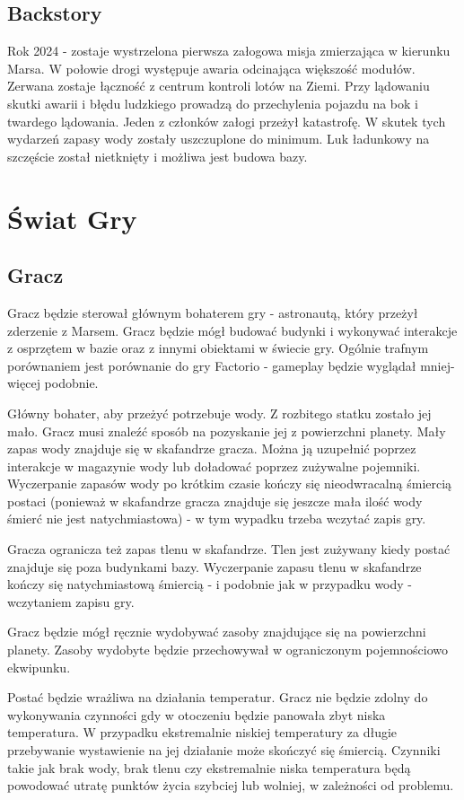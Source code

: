 \documentclass[a4paper,12pt]{article}
\begin{document}
\subsection{Backstory}
Rok 2024 - zostaje wystrzelona pierwsza załogowa misja zmierzająca w kierunku Marsa. W połowie drogi występuje awaria odcinająca większość modułów. Zerwana zostaje łączność z centrum kontroli lotów na Ziemi. Przy lądowaniu skutki awarii i błędu ludzkiego prowadzą do przechylenia pojazdu na bok i twardego lądowania. Jeden z członków załogi przeżył katastrofę. W skutek tych wydarzeń zapasy wody zostały uszczuplone do minimum. Luk ładunkowy na szczęście został nietknięty i możliwa jest budowa bazy.
\section{Świat Gry}
\subsection{Gracz}
Gracz będzie sterował głównym bohaterem gry - astronautą, który przeżył zderzenie z Marsem. Gracz będzie mógł budować budynki i wykonywać interakcje z osprzętem w bazie oraz z innymi obiektami w świecie gry. Ogólnie trafnym porównaniem jest porównanie do gry Factorio - gameplay będzie wyglądał mniej-więcej podobnie. 

Główny bohater, aby przeżyć potrzebuje wody. Z rozbitego statku zostało jej mało. Gracz musi znaleźć sposób na pozyskanie jej z powierzchni planety. Mały zapas wody znajduje się w skafandrze gracza. Można ją uzupełnić poprzez interakcje w magazynie wody lub doładować poprzez zużywalne pojemniki. Wyczerpanie zapasów wody po krótkim czasie kończy się nieodwracalną śmiercią postaci (ponieważ w skafandrze gracza znajduje się jeszcze mała ilość wody śmierć nie jest natychmiastowa) - w tym wypadku trzeba wczytać zapis gry. 

Gracza ogranicza też zapas tlenu w skafandrze. Tlen jest zużywany kiedy postać znajduje się poza budynkami bazy. Wyczerpanie zapasu tlenu w skafandrze kończy się natychmiastową śmiercią - i podobnie jak w przypadku wody - wczytaniem zapisu gry.

Gracz będzie mógł ręcznie wydobywać zasoby znajdujące się na powierzchni planety. Zasoby wydobyte będzie przechowywał w ograniczonym pojemnościowo ekwipunku.

Postać będzie wrażliwa na działania temperatur. Gracz nie będzie zdolny do wykonywania czynności gdy w otoczeniu będzie panowała zbyt niska temperatura. W przypadku ekstremalnie niskiej temperatury za długie przebywanie wystawienie na jej działanie może skończyć się śmiercią.
Czynniki takie jak brak wody, brak tlenu czy ekstremalnie niska temperatura będą powodować utratę punktów życia szybciej lub wolniej, w zależności od problemu.
\end{document}
